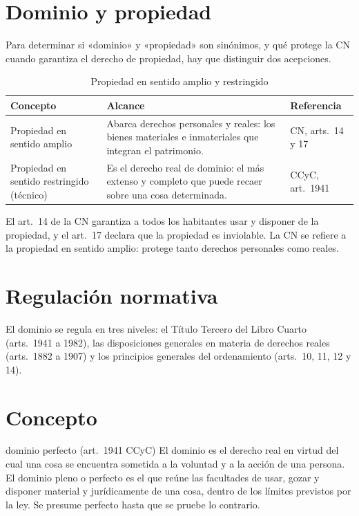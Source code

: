 \documentclass[12pt,oneside]{book}
\begin{document}
\section{Dominio y propiedad}

Para determinar si «dominio» y «propiedad» son sinónimos, y qué protege la CN cuando garantiza el derecho de propiedad, hay que distinguir dos acepciones.

\begin{table}[H]
\centering
\small
\begin{tabularx}{\textwidth}{>{\raggedright\arraybackslash}p{}>{\raggedright\arraybackslash}X>{\raggedright\arraybackslash}p{}}
\toprule
\textbf{Concepto} & \textbf{Alcance} & \textbf{Referencia} \\
\midrule
Propiedad en sentido amplio & Abarca derechos personales y reales: los bienes materiales e inmateriales que integran el patrimonio. & CN, arts.~14 y 17 \\
Propiedad en sentido restringido (técnico) & Es el derecho real de dominio: el más extenso y completo que puede recaer sobre una cosa determinada. & CCyC, art.~1941 \\
\bottomrule
\end{tabularx}
\caption{Propiedad en sentido amplio y restringido}
\end{table}

El art.~14 de la CN garantiza a todos los habitantes usar y disponer de la propiedad, y el art.~17 declara que la propiedad es inviolable. La CN se refiere a la propiedad en sentido amplio: protege tanto derechos personales como reales.

\section{Regulación normativa}

El dominio se regula en tres niveles: el Título Tercero del Libro Cuarto (arts.~1941 a 1982), las disposiciones generales en materia de derechos reales (arts.~1882 a 1907) y los principios generales del ordenamiento (arts.~10, 11, 12 y 14).

\section{Concepto}

\begin{definicion}{dominio perfecto (art.~1941 CCyC)}
El dominio es el derecho real en virtud del cual una cosa se encuentra sometida a la voluntad y a la acción de una persona. El dominio pleno o perfecto es el que reúne las facultades de usar, gozar y disponer material y jurídicamente de una cosa, dentro de los límites previstos por la ley. Se presume perfecto hasta que se pruebe lo contrario.
\end{definicion}
\end{document}

